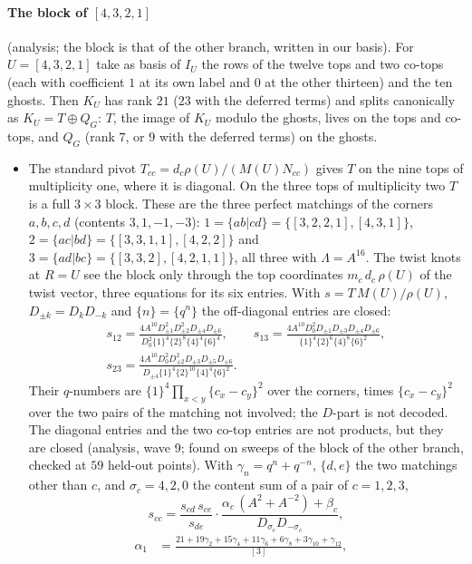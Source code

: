 \documentclass[11pt]{article}
\newcommand{\Lam}{\Lambda}
\begin{document}
\paragraph{The block of $[4,3,2,1]$} (analysis; the block is that of the other branch, written in our basis).  For
$U=[4,3,2,1]$ take as basis of $I_U$ the rows of the twelve tops and two co-tops (each with coefficient $1$ at its own
label and $0$ at the other thirteen) and the ten ghosts.  Then $K_U$ has rank $21$ ($23$ with the deferred terms) and
splits canonically as $K_U=T\oplus Q_G$: $T$, the image of $K_U$ modulo the ghosts, lives on the tops and co-tops, and
$Q_G$ (rank $7$, or $9$ with the deferred terms) on the ghosts.
\begin{itemize}
\item The standard pivot $T_{cc}=d_c\rho(U)/(M(U)N_{cc})$ gives $T$ on the nine tops of multiplicity one, where it is
diagonal.  On the three tops of multiplicity two $T$ is a full $3\times3$ block.  These are the three perfect matchings of the corners
$a,b,c,d$ (contents $3,1,-1,-3$): $1=\{ab|cd\}=\{[3,2,2,1],[4,3,1]\}$, $2=\{ac|bd\}=\{[3,3,1,1],[4,2,2]\}$ and
$3=\{ad|bc\}=\{[3,3,2],[4,2,1,1]\}$, all three with $\Lam=A^{16}$.  The twist knots at $R=U$ see the block only through
the top coordinates $m_c\,d_c\,\rho(U)$ of the twist vector, three equations for its six entries.  With
$s=T\,M(U)/\rho(U)$, $D_{\pm k}=D_kD_{-k}$ and $\{n\}=\{q^n\}$ the off-diagonal entries are closed:
\begin{gather*}
s_{12}=\frac{4A^{10}D_{\pm1}^2D_{\pm2}^2D_{\pm4}D_{\pm6}}{D_0^2\{1\}^4\{2\}^8\{4\}^4\{6\}^4},\qquad
s_{13}=\frac{4A^{10}D_0^2D_{\pm1}D_{\pm3}D_{\pm4}D_{\pm6}}{\{1\}^4\{2\}^6\{4\}^8\{6\}^2},\\
s_{23}=\frac{4A^{10}D_0^2D_{\pm2}^2D_{\pm3}D_{\pm5}D_{\pm6}}{D_{\pm4}\{1\}^4\{2\}^{10}\{4\}^4\{6\}^2}.
\end{gather*}
Their $q$-numbers are $\{1\}^4\prod_{x<y}\{c_x-c_y\}^2$ over the corners, times $\{c_x-c_y\}^2$ over the two pairs of the
matching not involved; the $D$-part is not decoded.  The diagonal entries and the two co-top entries are not products,
but they are closed (analysis, wave 9; found on sweeps of the block of the other branch, checked at $59$ held-out
points).  With $\gamma_n=q^n+q^{-n}$, $\{d,e\}$ the two matchings other than $c$, and $\sigma_c=4,2,0$ the content sum of
a pair of $c=1,2,3$,
\[
s_{cc}=\frac{s_{cd}\,s_{ce}}{s_{de}}\cdot\frac{\alpha_c\,(A^2+A^{-2})+\beta_c}{D_{\sigma_c}D_{-\sigma_c}},
\]
\begin{align*}
\alpha_1&=\tfrac{21+19\gamma_2+15\gamma_4+11\gamma_6+6\gamma_8+3\gamma_{10}+\gamma_{12}}{[3]}, &

\end{align*}
\end{itemize}
\end{document}
